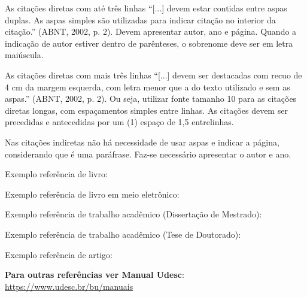 As citações diretas com até três linhas ``[...] devem estar contidas entre aspas duplas. As aspas simples são utilizadas para indicar citação no interior da citação.'' (ABNT, 2002, p. 2). Devem apresentar autor, ano e página. Quando a indicação de autor estiver dentro de parênteses, o sobrenome deve ser em letra maiúscula. 


As citações diretas com mais três linhas ``[...] devem ser destacadas com recuo de 4 cm da margem esquerda, com letra menor que a do texto utilizado e sem as aspas.'' (ABNT, 2002, p. 2). Ou seja, utilizar fonte tamanho 10 para as citações diretas longas, com espaçamentos simples entre linhas. As citações devem ser precedidas e antecedidas por um (1) espaço de 1,5 entrelinhas. 


Nas citações indiretas não há necessidade de usar aspas e indicar a página, considerando que é uma paráfrase. Faz-se necessário apresentar o autor e ano.




\noindent Exemplo referência de livro: \cite{exemplo_livro}

\noindent Exemplo referência de livro em meio eletrônico: \cite{exemplo_livroe}

\noindent Exemplo referência de trabalho acadêmico (Dissertação de Mestrado): \cite{exemplo_dissertacao}

\noindent Exemplo referência de trabalho acadêmico (Tese de Doutorado): \cite{exemplo_tese}

\noindent Exemplo referência de artigo: \cite{exemplo_artigo}


\textbf{Para outras referências ver Manual Udesc}: \url{https://www.udesc.br/bu/manuais}








